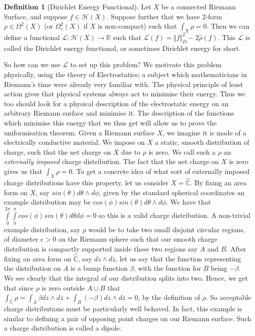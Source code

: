 \documentclass[11pt]{report}
\theoremstyle{definition}
\newtheorem{defn}[thm]{Definition}
\begin{document}
\begin{defn}[Dirichlet Energy Functional]
  Let $X$ be a connected Riemann Surface, and suppose $f \in \mathcal{H}(X)$. Suppose further that we have $2$-form $\rho \in \Omega^2 (X)$ (or $\Omega^2_c (X)$ if $X$ is non-compact) such that $\int_X \rho = 0$. Then we can define a functional $\mathcal{L}: \mathcal{H}(X) \rightarrow \mathbb{R}$ such that $\mathcal{L}(f) = \Vert f\Vert ^2_D - 2\hat{\rho}(f)$. This $\mathcal{L}$ is called the Dirichlet energy functional, or sometimes Dirichlet energy for short.
\end{defn}
So how can we use $\mathcal{L}$ to set up this problem? We motivate this problem physically, using the theory of Electrostatics; a subject which mathematicians in Riemann's time were already very familiar with. The physical principle of least action gives that physical systems always act to minimise their energy. Thus we too should look for a physical description of the electrostatic energy on an arbitrary Riemann surface and minimise it. The description of the functions which minimise this energy that we thus get will allow us to prove the uniformisation theorem. Given a Riemann surface $X$, we imagine it is made of a electrically conductive material. We impose on $X$ a static, smooth distribution of charge, such that the net charge on $X$ due to $\rho$ is zero. We call such a $\rho$ an \emph{externally imposed} charge distribution. The fact that the net charge on $X$ is zero gives us that $\int_X \rho = 0$. To get a concrete idea of what sort of externally imposed charge distributions have this property, let us consider $X=\widehat{\mathbb{C}}$. By fixing an area form on $X$, say $sin(\theta) d\theta\wedge d\phi$, given by the standard spherical coordinates an example distribution may be $cos(\phi)sin(\theta)d\theta\wedge d\phi$. We have that $\int\limits_0^{2\pi}\int\limits_0^{\pi} cos(\phi)sin(\theta)d\theta d\phi = 0$ so this is a valid charge distribution. A non-trivial example distribution, say $\rho$ would be to take two small disjoint circular regions, of diameter $\epsilon > 0$ on the Riemann sphere such that our smooth charge distribution is compactly supported inside these two regions say $A$ and $B$. After fixing an area form on $\widehat{\mathbb{C}}$, say $dz \wedge d\overline{z}$, let us say that the function representing the distribution on $A$ is a bump function $\beta$, with the function for $B$ being $-\beta$. We see clearly that the integral of our distribution splits into two. Hence, we get that since $\rho$ is zero outside $A \cup B$ that $\int_{\widehat{\mathbb{C}}} \rho = \int_A \beta dz\wedge d\overline{z} + \int_B (-\beta) dz\wedge d\overline{z} = 0$, by the definition of $\rho$. So acceptable charge distributions must be particularly well behaved. In fact, this example is similar to defining a pair of opposing point charges on our Riemann surface. Such a charge distribution is called a dipole. 
\end{document}

